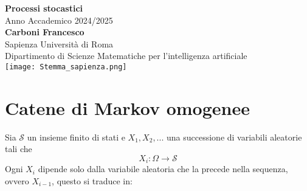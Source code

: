 \documentclass{article}
\theoremstyle{definition}
\theoremstyle{remark}
\begin{document}
\begin{titlepage}
    \centering
    \vspace*{1cm}
    
    {\Huge \textbf{Processi stocastici}} \\[1.5cm]
    
    {\Large Anno Accademico 2024/2025} \\[2cm]
    
    {\Large \textbf{Carboni Francesco}} \\[0.5cm]
    {\large Sapienza Università di Roma} \\
    {\large Dipartimento di Scienze Matematiche per l'intelligenza artificiale} \\[2cm]
    
   \texttt{[image: Stemma\_sapienza.png]} \\[2cm]
        
    \vfill
\end{titlepage}
\tableofcontents 
\newpage
\section{Catene di Markov omogenee}
Sia $\mathcal{S}$ un insieme finito di stati e $X_1,X_2,...$  una successione di variabili aleatorie tali che
    $$X_i:\Omega \to \mathcal{S}$$
Ogni $X_i$ dipende solo dalla variabile aleatoria che la precede nella sequenza, ovvero $X_{i-1}$, questo si traduce in:
\end{document}
